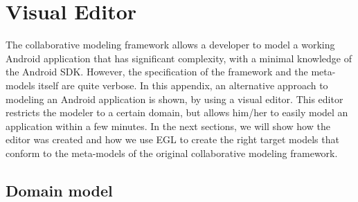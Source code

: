 \chapter{Visual Editor}
 
The collaborative modeling framework allows a developer to model a working Android application that has significant complexity, with a minimal knowledge of the Android SDK. However, the specification of the framework and the meta-models itself are quite verbose. In this appendix, an alternative approach to modeling an Android application is shown, by using a visual editor. This editor restricts the modeler to a certain domain, but allows him/her to easily model an application within a few minutes. In the next sections, we will show how the editor was created and how we use EGL to create the right target models that conform to the meta-models of the original collaborative modeling framework.

\section{Domain model}

